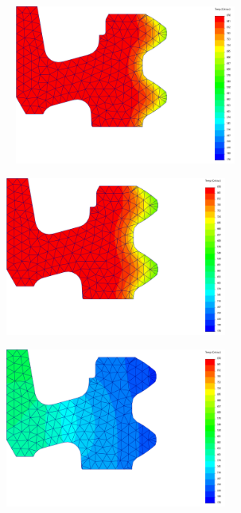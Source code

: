 \begin{figure}[htb]
    \centering
    \begin{subfigure}{.33\textwidth}\
        \centering
        \includegraphics[width = 0.8\textwidth]{Figures/Cap4/AC3_Dentado.png}
        \caption[]%
        {}
        \label{fig:A3_Dent}
    \end{subfigure}%
    \begin{subfigure}{.33\textwidth}
        \centering
        \includegraphics[width = 0.8\textwidth]{Figures/Cap4/AC1_Dentado.png}
        \caption{}
        \label{fig:A1_Dent}
    \end{subfigure}
    \begin{subfigure}{.33\textwidth}
        \centering
        \includegraphics[width = 0.8\textwidth]{Figures/Cap4/TF_Dentado.png}

\end{subfigure}
\end{figure}
